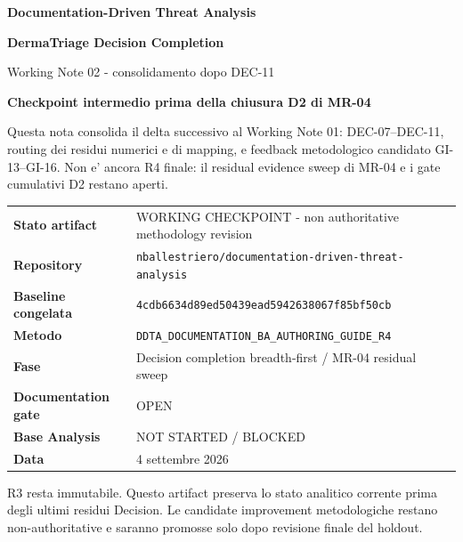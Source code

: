 \documentclass[11pt,a4paper]{article}
\begin{document}

\begin{titlepage}
\thispagestyle{empty}
\vspace*{8mm}
{\sffamily\bfseries\color{DDTANavy}\fontsize{15}{18}\selectfont Documentation-Driven Threat Analysis}\par
\vspace{5mm}
{\sffamily\bfseries\color{DDTANavy}\fontsize{28}{32}\selectfont DermaTriage Decision Completion}\par
\vspace{2mm}
{\sffamily\color{DDTABlue}\fontsize{18}{22}\selectfont Working Note 02 - consolidamento dopo DEC-11}\par
\vspace{10mm}
\begin{tcolorbox}[enhanced,arc=3pt,boxrule=0pt,colback=DDTANavy,left=12pt,right=12pt,top=11pt,bottom=11pt]
{\color{white}\sffamily\bfseries\large Checkpoint intermedio prima della chiusura D2 di MR-04}\par
\vspace{2mm}
{\color{white!88}\small Questa nota consolida il delta successivo al Working Note 01: DEC-07--DEC-11, routing dei residui numerici e di mapping, e feedback metodologico candidato GI-13--GI-16. Non e' ancora R4 finale: il residual evidence sweep di MR-04 e i gate cumulativi D2 restano aperti.}
\end{tcolorbox}
\vspace{8mm}
\begin{tabularx}{\textwidth}{L{48mm}Y}
\toprule
\textbf{Stato artifact} & WORKING CHECKPOINT - non authoritative methodology revision \\
\textbf{Repository} & \texttt{nballestriero/documentation-driven-threat-analysis} \\
\textbf{Baseline congelata} & \texttt{4cdb6634d89ed50439ead5942638067f85bf50cb} \\
\textbf{Metodo} & \texttt{DDTA\_DOCUMENTATION\_BA\_AUTHORING\_GUIDE\_R4} \\
\textbf{Fase} & Decision completion breadth-first / MR-04 residual sweep \\
\textbf{Documentation gate} & OPEN \\
\textbf{Base Analysis} & NOT STARTED / BLOCKED \\
\textbf{Data} & 4 settembre 2026 \\
\bottomrule
\end{tabularx}
\vfill
\begin{ddtaprinciple}[title={Checkpoint rule}]
R3 resta immutabile. Questo artifact preserva lo stato analitico corrente prima degli ultimi residui Decision. Le candidate improvement metodologiche restano non-authoritative e saranno promosse solo dopo revisione finale del holdout.
\end{ddtaprinciple}
\end{titlepage}
\end{document}
